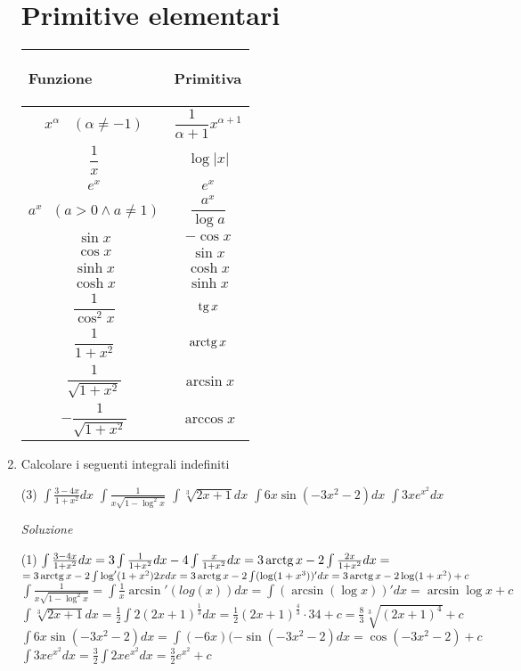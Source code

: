 \documentclass{article}
\begin{document}
\begin{enumerate}[label=\textbf{Esercizio 10.\arabic*.},itemindent=*]
\begin{table*}[ht]
    \section*{Primitive elementari}
    \begin{tabular}{|m{}|m{}|}
        \hline\begin{center}\textbf{Funzione}\end{center} & \begin{center}\textbf{Primitiva}\end{center}\\ \hline\hline
        \[x^\alpha~~~~(\alpha\neq -1)\]& \[\frac{1}{\alpha+1}x^{\alpha+1}\]\\\hline
        \[\frac{1}{x}\]&\[\log|x|\]\\\hline
        \[e^x\]&\[e^x\]\\\hline
        \[a^x~~~(a>0\land a\neq 1)\]&\[\frac{a^x}{\log a}\]\\\hline
        \[\sin x\]&\[-\cos x\]\\\hline
        \[\cos x\]&\[\sin x\]\\\hline
        \[\sinh x\]&\[\cosh x\]\\\hline
        \[\cosh x\]&\[\sinh x\]\\\hline
        \[\frac{1}{\cos^2x}\]&\[\operatorname{tg} x\]\\\hline
        \[\frac{1}{1+x^2}\]&\[\operatorname{arctg} x\]\\\hline
        \[\frac{1}{\sqrt{1+x^2}}\]&\[\arcsin x\]\\\hline
        \[-\frac{1}{\sqrt{1+x^2}}\]&\[\arccos x\]\\\hline
    \end{tabular}
\end{table*}
\newpage
\item Calcolare i seguenti integrali indefiniti
\begin{tasks}(3)
    \task$\int\frac{3-4x}{1+x^2}dx$
    \task$\int\frac{1}{x\sqrt{1-\log^2x}}$
    \task$\int\sqrt[3]{2x+1}dx$
    \task$\int6x\sin(-3x^2-2)dx$
    \task$\int3xe^{x^2}dx$
\end{tasks}
\item[\textit{\large Soluzione~}]~
\begin{tasks}(1)
    \task$\int\frac{3-4x}{1+x^2}dx=3\int\frac{1}{1+x^2}dx-4\int\frac{x}{1+x^2}dx=3\operatorname{arctg} x-2\int\frac{2x}{1+x^2}dx=$\\$=3\operatorname{arctg} x-2\int \log'(1+x^2)2xdx=3\operatorname{arctg} x-2\int(\log(1+x^3))'dx=3\operatorname{arctg} x-2\log (1+x^2)+c$
    \task$\int\frac{1}{x\sqrt{1-\log^2x}}=\int \frac{1}{x}\arcsin'(log(x))dx=\int(\arcsin(\log x))'dx=\arcsin\log x+c$
    \task$\int\sqrt[3]{2x+1}dx=\frac{1}{2}\int 2(2x+1)^{\frac{1}{3}}dx=\frac{1}{2}(2x+1)^{\frac{4}{3}}\cdot{3}{4}+c=\frac{8}{3}\sqrt[3]{(2x+1)^4}+c$
    \task$\int6x\sin(-3x^2-2)dx=\int(-6x)(-\sin(-3x^2-2)dx=\cos (-3x^2-2)+c$
    \task$\int3xe^{x^2}dx=\frac{3}{2}\int2xe^{x^2}dx=\frac{3}{2}e^{x^2}+c$
\end{tasks}
\end{enumerate}
\end{document}

